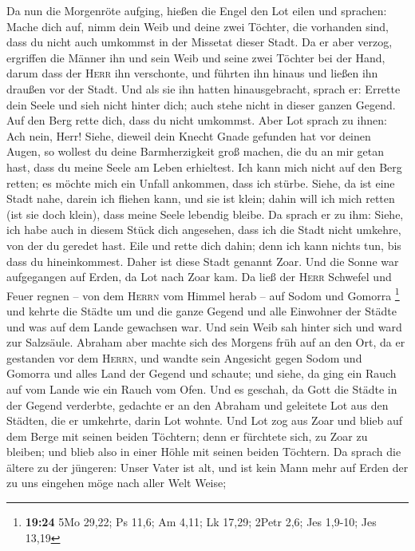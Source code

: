  Da nun die Morgenröte aufging, hießen die Engel den Lot
eilen und sprachen: Mache dich auf, nimm dein Weib und deine zwei
Töchter, die vorhanden sind, dass du nicht auch umkommst in der Missetat
dieser Stadt.  Da er aber verzog, ergriffen die Männer
ihn und sein Weib und seine zwei Töchter bei der Hand, darum dass der
\textsc{Herr} ihn verschonte, und führten ihn hinaus und ließen ihn
draußen vor der Stadt.  Und als sie ihn hatten
hinausgebracht, sprach er: Errette dein Seele und sieh nicht hinter
dich; auch stehe nicht in dieser ganzen Gegend. Auf den Berg rette dich,
dass du nicht umkommst.  Aber Lot sprach zu ihnen: Ach
nein, Herr!  Siehe, dieweil dein Knecht Gnade gefunden
hat vor deinen Augen, so wollest du deine Barmherzigkeit groß machen,
die du an mir getan hast, dass du meine Seele am Leben erhieltest. Ich
kann mich nicht auf den Berg retten; es möchte mich ein Unfall ankommen,
dass ich stürbe.  Siehe, da ist eine Stadt nahe, darein
ich fliehen kann, und sie ist klein; dahin will ich mich retten (ist sie
doch klein), dass meine Seele lebendig bleibe.  Da sprach
er zu ihm: Siehe, ich habe auch in diesem Stück dich angesehen, dass ich
die Stadt nicht umkehre, von der du geredet hast.  Eile
und rette dich dahin; denn ich kann nichts tun, bis dass du
hineinkommest. Daher ist diese Stadt genannt Zoar.  Und
die Sonne war aufgegangen auf Erden, da Lot nach Zoar kam.
 Da ließ der \textsc{Herr} Schwefel und Feuer regnen --
von dem \textsc{Herrn} vom Himmel herab -- auf Sodom und Gomorra
\footnote{\textbf{19:24} 5Mo 29,22; Ps 11,6; Am 4,11; Lk 17,29; 2Petr
  2,6; Jes 1,9-10; Jes 13,19}  und kehrte die Städte um
und die ganze Gegend und alle Einwohner der Städte und was auf dem Lande
gewachsen war.  Und sein Weib sah hinter sich und ward
zur Salzsäule.  Abraham aber machte sich des Morgens früh
auf an den Ort, da er gestanden vor dem \textsc{Herrn}, 
und wandte sein Angesicht gegen Sodom und Gomorra und alles Land der
Gegend und schaute; und siehe, da ging ein Rauch auf vom Lande wie ein
Rauch vom Ofen.  Und es geschah, da Gott die Städte in
der Gegend verderbte, gedachte er an den Abraham und geleitete Lot aus
den Städten, die er umkehrte, darin Lot wohnte.  Und Lot
zog aus Zoar und blieb auf dem Berge mit seinen beiden Töchtern; denn er
fürchtete sich, zu Zoar zu bleiben; und blieb also in einer Höhle mit
seinen beiden Töchtern.  Da sprach die ältere zu der
jüngeren: Unser Vater ist alt, und ist kein Mann mehr auf Erden der zu
uns eingehen möge nach aller Welt Weise;

